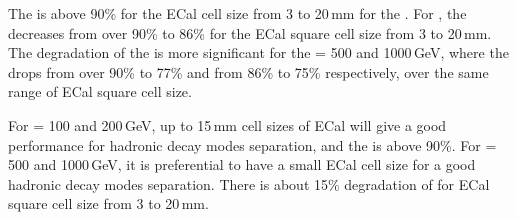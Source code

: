 The \tauHad is above 90\% for the ECal cell size from 3 to 20\,mm for the . For , the \tauHad decreases from over 90\% to 86\% for the ECal square cell size from 3 to 20\,mm. The degradation of the \tauHad is more significant for the \sqrtS = 500 and 1000\,GeV, where the \tauHad drops from over 90\% to 77\%  and from 86\% to 75\% respectively, over the same range of ECal square cell size.

For \sqrtS = 100 and 200\,GeV, up to 15\,mm cell sizes of ECal will give a good performance for \Pgt hadronic decay modes separation, and the \tauHad is above 90\%. For \sqrtS = 500 and 1000\,GeV, it is preferential to have a small ECal cell size for a good \Pgt hadronic decay modes separation. There is about 15\% degradation of \tauHad for ECal square cell size from 3 to 20\,mm.

\section{}